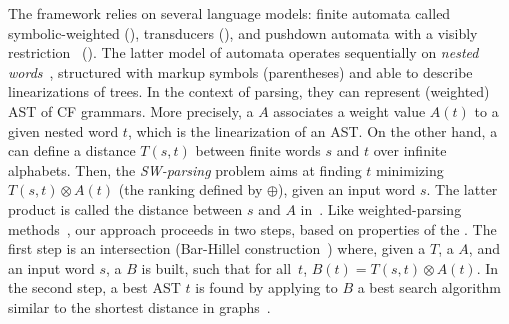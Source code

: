%
%
The framework relies on several language models:
finite automata called symbolic-weighted (\SWA),
transducers (\SWT), and pushdown automata
with a visibly restriction~\cite{AlurMadhusudan09nested} (\SWVPA).
The latter model of automata operates sequentially on \emph{nested words}~\cite{AlurMadhusudan09nested},
structured with markup symbols (parentheses) and able to describe linearizations of trees.
%
In the context of parsing, they can represent (weighted) AST of CF grammars.
More precisely, a \SWVPA $A$ associates a weight value $A(t)$ %
to a given nested word $t$, which is the linearization of an AST. %
%
On the other hand,
a \SWT can define a distance $T(s, t)$ between finite words $s$ and $t$
over infinite alphabets. %
Then, the \emph{SW-parsing} problem aims at %
finding $t$ minimizing
$T(s, t) \otimes A(t)$ (\wrt the ranking defined by $\oplus$), given an input word $s$.
The latter product is called the distance between $s$ and $A$ in~\cite{Mohri03EDWA}.
%
Like weighted-parsing
methods~\cite{Goodman99SemiringParsing,Nederhof03weightedParsing,MorbitzVogler19weighted-parsing},
our approach proceeds in two steps,
based on properties of the \swM.
The first step is an intersection
(Bar-Hillel construction~\cite{GruneJacobs08parsing})
where, given a \SWT $T$, a \SWVPA $A$, and an input word $s$,
a \SWVPA $B$ %
is built, such that for all~$t$,  $B(t) = T(s, t) \otimes A(t)$.%
In the second step, a best AST $t$ is found by applying to $B$ %
a best search algorithm similar to the shortest distance
in graphs~\cite{Mohri02semiring,Huang05kbest}.
%

